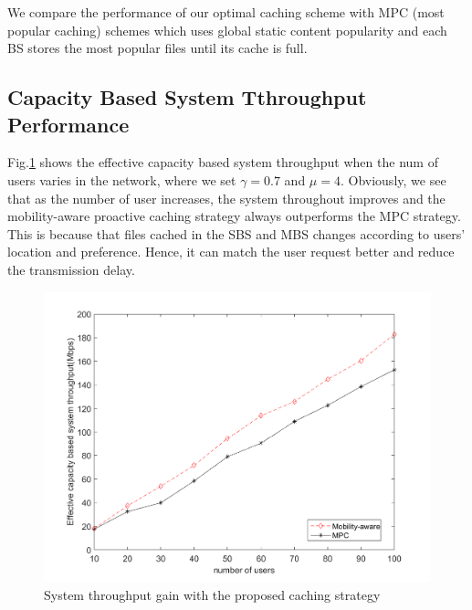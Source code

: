 \documentclass[conference]{IEEEtran}
\begin{document}
We compare the performance of our optimal caching scheme with MPC (most popular caching) schemes which uses global static content popularity and each BS stores the most popular files until its cache is full\cite{6600983}.
\subsection{Capacity Based System Tthroughput Performance}
  Fig.\ref{fig 3} shows the effective capacity based system throughput when the num of users varies in the network, where we set $\gamma=0.7$ and $\mu=4$. Obviously, we see that as the number of user increases, the system throughout improves and the mobility-aware proactive caching strategy always outperforms the MPC strategy. This is because that files cached in the SBS and MBS changes according to users’ location and preference. Hence, it can match the user request better and reduce the transmission delay.
\begin{figure}[htbp]
 \centerline{\includegraphics[scale=0.35]{fig3.png}}
 \caption{System throughput gain with the proposed caching strategy}
 \label{fig 3}
\end{figure}
\end{document}

